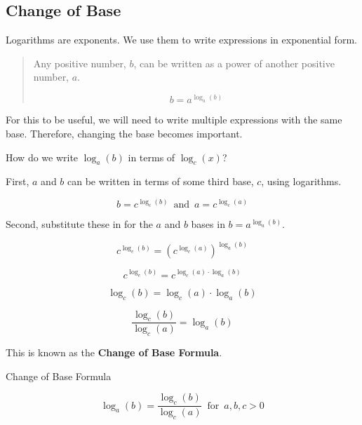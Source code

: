 \documentclass{ximera}
\begin{document}
\subsection*{Change of Base}


Logarithms are exponents.  We use them to write expressions in exponential form.



\begin{quote}

Any positive number, $b$, can be written as a power of another positive number, $a$.

\[    b = a^{\log_a(b)}  \]

\end{quote}

For this to be useful, we will need to write multiple expressions with the same base. Therefore, changing the base becomes important.

How do we write $\log_a(b)$ in terms of $\log_c(x)$?




First, $a$ and $b$ can be written in terms of some third base, $c$, using logarithms.


\[    b = c^{\log_c(b)} \,   \text{ and } \,      a = c^{\log_c(a)}      \]



Second, substitute these in for the $a$ and $b$ bases in $b = a^{\log_a(b)}$.



\[   c^{\log_c(b)} = \left(c^{\log_c(a)}\right)^{\log_a(b)}  \]



\[   c^{\log_c(b)} = c^{\log_c(a) \cdot \log_a(b)}  \]



\[   \log_c(b) = \log_c(a) \cdot \log_a(b)  \]


\[   \frac{\log_c(b)}{\log_c(a)} =  \log_a(b)  \]


This is known as the \textbf{Change of Base Formula}.








\begin{template}  Change of Base Formula

\[   \log_a(b)  =  \frac{\log_c(b)}{\log_c(a)}        \, \text{ for } \, a, b, c  > 0        \]


\end{template}
\end{document}
